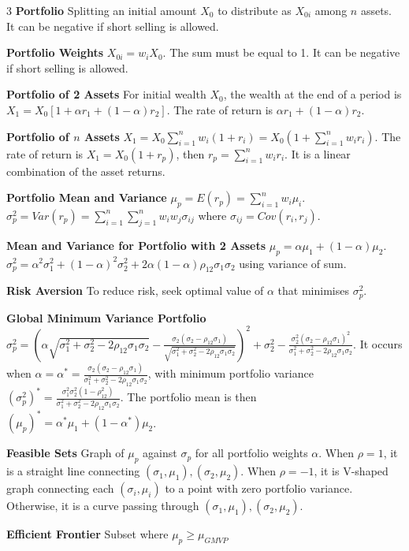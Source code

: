 \documentclass[10pt, landscape]{article}
\begin{document}
\begin{multicols*}{3}
\textbf{Portfolio} Splitting an initial amount $X_0$ to distribute as $X_{0i}$ among $n$ assets. It can be negative if short selling is allowed.

\textbf{Portfolio Weights} $X_{0i}=w_iX_0$. The sum must be equal to 1. It can be negative if short selling is allowed.

\textbf{Portfolio of 2 Assets} For initial wealth $X_0$, the wealth at the end of a period is $X_1=X_0[1+\alpha r_1+(1-\alpha)r_2]$. The rate of return is $\alpha r_1+(1-\alpha)r_2$.

\textbf{Portfolio of $n$ Assets} $X_1=X_0\sum_{i=1}^n w_i (1+r_i)=X_0(1+\sum_{i=1}^n w_ir_i)$. The rate of return is $X_1=X_0(1+r_p)$, then $r_p=\sum_{i=1}^n w_ir_i$. It is a linear combination of the asset returns.

\textbf{Portfolio Mean and Variance} $\mu_p=E(r_p)=\sum_{i=1}^n w_i \mu_i$. $\sigma_p^2=Var(r_p)=\sum_{i=1}^n\sum_{j=1}^n w_iw_j \sigma_{ij}$ where $\sigma_{ij}=Cov(r_i, r_j)$.

\textbf{Mean and Variance for Portfolio with 2 Assets} $\mu_p=\alpha \mu_1+(1-\alpha)\mu_2$. $\sigma_p^2=\alpha^2 \sigma_1^2+(1-\alpha)^2\sigma_2^2+2\alpha(1-\alpha)\rho_{12}\sigma_1\sigma_2$ using variance of sum.

\textbf{Risk Aversion} To reduce risk, seek optimal value of $\alpha$ that minimises $\sigma_p^2$.

\textbf{Global Minimum Variance Portfolio} $\sigma_p^2=(\alpha\sqrt{\sigma_1^2+\sigma_2^2-2\rho_{12}\sigma_1\sigma_2}-\frac{\sigma_2(\sigma_2-\rho_{12}\sigma_1)}{\sqrt{\sigma_1^2+\sigma_2^2-2\rho_{12}\sigma_1\sigma_2}})^2+\sigma_2^2-\frac{\sigma_2^2(\sigma_2-\rho_{12}\sigma_1)^2}{\sigma_1^2+\sigma_2^2-2\rho_{12}\sigma_1\sigma_2}$. It occurs when $\alpha=\alpha^*=\frac{\sigma_2(\sigma_2-\rho_{12}\sigma_1)}{\sigma_1^2+\sigma_2^2-2\rho_{12}\sigma_1\sigma_2}$, with minimum portfolio variance $(\sigma_p^2)^*=\frac{\sigma_1^2\sigma_2^2(1-\rho_{12}^2)}{\sigma_1^2+\sigma_2^2-2\rho_{12}\sigma_1\sigma_2}$. The portfolio mean is then $(\mu_p)^*=\alpha^*\mu_1+(1-\alpha^*)\mu_2$.

\textbf{Feasible Sets} Graph of $\mu_p$ against $\sigma_p$ for all portfolio weights $\alpha$. When $\rho=1$, it is a straight line connecting $(\sigma_1, \mu_1), (\sigma_2, \mu_2)$. When $\rho=-1$, it is V-shaped graph connecting each $(\sigma_i, \mu_i)$ to a point with zero portfolio variance. Otherwise, it is a curve passing through $(\sigma_1, \mu_1), (\sigma_2, \mu_2)$.

\textbf{Efficient Frontier} Subset where $\mu_p\geq \mu_{GMVP}$


\end{multicols*}
\end{document}
